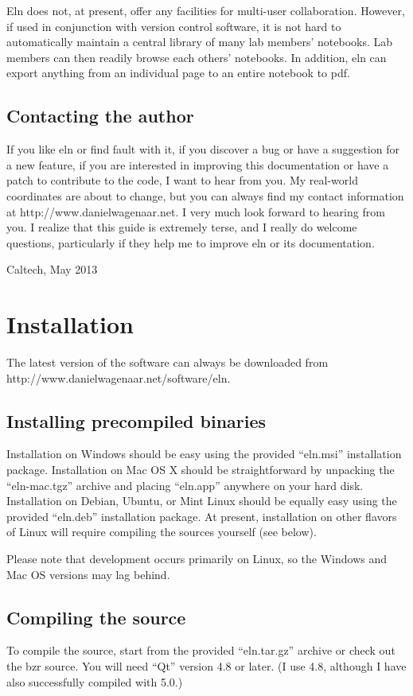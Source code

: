 \documentclass[11pt]{report}
\begin{document}
Eln does not, at present, offer any facilities for multi-user
collaboration. However, if used in conjunction with version control
software, it is not hard to automatically maintain a central library of
many lab members' notebooks. Lab members can then readily browse each
others' notebooks. In addition, eln can export anything from an
individual page to an entire notebook to pdf.

\section{Contacting the author}

If you like eln or find fault with it, if you discover a bug or have a
suggestion for a new feature, if you are interested in improving this
documentation or have a patch to contribute to the code, I want to
hear from you. My real-world coordinates are about to change, but
you can always find my contact information at
http://www.danielwagenaar.net. I very much look forward to hearing
from you. I realize that this guide is extremely terse, and I
really do welcome questions, particularly if they help me to improve
eln or its documentation.\medskip

\noindent Caltech, May 2013

\chapter{Installation}

The latest version of the software can always be downloaded from\break
http://www.danielwagenaar.net/software/eln.

\section{Installing precompiled binaries}

Installation on Windows should be easy using the provided ``eln.msi''
installation package. Installation on Mac OS X should be
straightforward by unpacking the ``eln-mac.tgz'' archive and placing
``eln.app'' anywhere on your hard disk.
Installation on Debian, Ubuntu, or Mint Linux
should be equally easy using the provided ``eln.deb'' installation
package. At present, installation on other flavors of Linux will
require compiling the sources yourself (see below).

Please note that development occurs
primarily on Linux, so the Windows and Mac OS versions may lag
behind.

\section{Compiling the source}
To compile the source,  start from the provided
``eln.tar.gz'' archive or check out the bzr source. You will need
``Qt'' version 4.8 or later. (I use 4.8, although I have also
successfully compiled with 5.0.)
\end{document}
